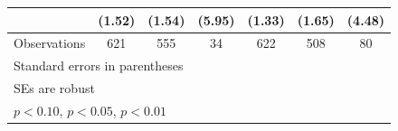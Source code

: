 \begin{table}[htbp]
\begin{tabular}{l*{6}{c}}
                &   (1.52)         &   (1.54)         &   (5.95)         &   (1.33)         &   (1.65)         &   (4.48)         \\
\hline
Observations    &      621         &      555         &       34         &      622         &      508         &       80         \\
\hline\hline
\multicolumn{7}{l}{\footnotesize Standard errors in parentheses}\\
\multicolumn{7}{l}{\footnotesize SEs are robust}\\
\multicolumn{7}{l}{\footnotesize \sym{*} \(p<0.10\), \sym{**} \(p<0.05\), \sym{***} \(p<0.01\)}\\
\end{tabular}
\end{table}
